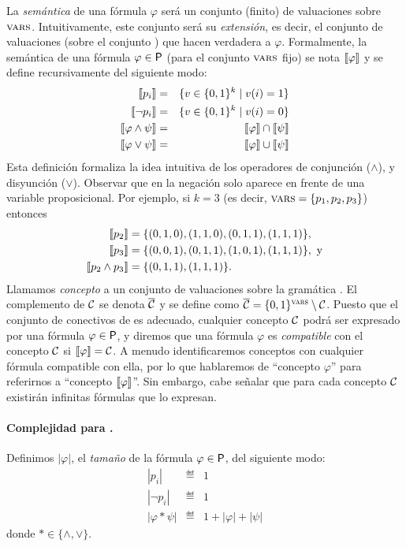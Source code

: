 La {\em semántica} de una fórmula $\varphi$ será un conjunto (finito) de valuaciones sobre $\textsc{vars}$. Intuitivamente, este conjunto será su {\em extensión}, es decir, el conjunto de valuaciones (sobre el conjunto \propvars) que hacen verdadera a $\varphi$. 
%
Formalmente, la semántica de una fórmula $\varphi\in{\sf P}$ (para el conjunto $\textsc{vars}$ fijo) se nota $\llbracket \varphi\rrbracket$  y se define recursivamente del siguiente modo:
%
\begin{eqnarray*}
\llbracket p_i\rrbracket &=& \{ v\in\{0,1\}^k \mid v(i)=1\}\\
\llbracket \lnot p_i\rrbracket &=& \{ v\in\{0,1\}^k \mid v(i)=0\}\\
\llbracket \varphi\wedge\psi\rrbracket &=& \llbracket \varphi\rrbracket\cap\llbracket \psi\rrbracket\\
\llbracket \varphi\vee\psi\rrbracket &=& \llbracket \varphi\rrbracket\cup\llbracket \psi\rrbracket
\end{eqnarray*}
%
Esta definición formaliza la idea intuitiva de los operadores de conjunción ($\wedge$), y disyunción ($\vee$). Observar que en \grambool la negación solo aparece en frente de una variable proposicional. Por ejemplo, si $k=3$ (es decir, $\textsc{vars}=\{p_1,p_2,p_3\}$) entonces 
\begin{align*}
\llbracket p_2\rrbracket&=\{(0,1,0), (1,1,0), (0,1,1), (1,1,1)\},\\
\llbracket p_3\rrbracket&=\{(0,0,1), (0,1,1), (1,0,1), (1,1,1)\}, \textrm{ y}\\
\llbracket p_2\wedge p_3\rrbracket&=\{(0,1,1), (1,1,1)\}.
\end{align*}
Llamamos {\em concepto} a un conjunto de valuaciones sobre la gramática \grambool. El complemento de $\mathcal{C}$ se denota $\overline {\mathcal{C}}$ y se define como $\overline {\mathcal{C}}=\{0,1\}^{\textsc{vars}}\setminus \mathcal{C}$. Puesto que el conjunto de conectivos de \grambool es adecuado, cualquier concepto $\mathcal{C}$ podrá ser expresado por una fórmula $\varphi\in{\sf P}$, y diremos que una fórmula $\varphi$ es {\em compatible} con el concepto $\mathcal{C}$ si $\llbracket \varphi\rrbracket=\mathcal{C}$. A menudo identificaremos conceptos con cualquier fórmula compatible con ella, por lo que hablaremos de ``concepto $\varphi$'' para referirnos a ``concepto $\llbracket \varphi\rrbracket$''. Sin embargo, cabe señalar que para cada concepto $\mathcal{C}$ existirán infinitas fórmulas que lo expresan.

\paragraph{Complejidad para \grambool.} Definimos $|\varphi|$, el {\em tamaño} de la fórmula $\varphi\in{\sf P}$, del siguiente modo:
\begin{eqnarray*}
|p_i| &\eqdef& 1\\
|\lnot p_i| &\eqdef& 1\\
|\varphi*\psi| &\eqdef& 1+|\varphi|+|\psi|
\end{eqnarray*}
donde $*\in\{\wedge,\vee\}$.

